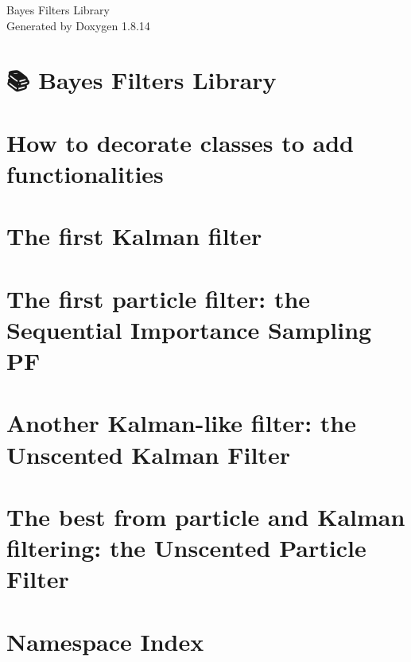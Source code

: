 \documentclass[twoside]{book}
\newcommand{\+}{\discretionary{\mbox{\scriptsize$\hookleftarrow$}}{}{}}
\newcommand{\clearemptydoublepage}{%
  \newpage{\pagestyle{empty}\cleardoublepage}%
}
\begin{document}
\hypersetup{pageanchor=false,
             bookmarksnumbered=true,
             pdfencoding=unicode
            }
\begin{titlepage}
\vspace*{7cm}
\begin{center}%
{\Large Bayes Filters Library }\\
\vspace*{1cm}
{\large Generated by Doxygen 1.8.14}\\
\end{center}
\end{titlepage}
\clearemptydoublepage
{}
\tableofcontents
\clearemptydoublepage
{}
\hypersetup{pageanchor=true}

\chapter{📚 Bayes Filters Library}
\label{index}\hypertarget{index}{}
\chapter{How to decorate classes to add functionalities}
\label{decorate-classes}

\chapter{The first Kalman filter}
\label{kf}

\chapter{The first particle filter\+: the Sequential Importance Sampling PF}
\label{sis}

\chapter{Another Kalman-\/like filter\+: the Unscented Kalman Filter}
\label{ukf}

\chapter{The best from particle and Kalman filtering\+: the Unscented Particle Filter}
\label{upf}

\chapter{Namespace Index}

\end{document}
